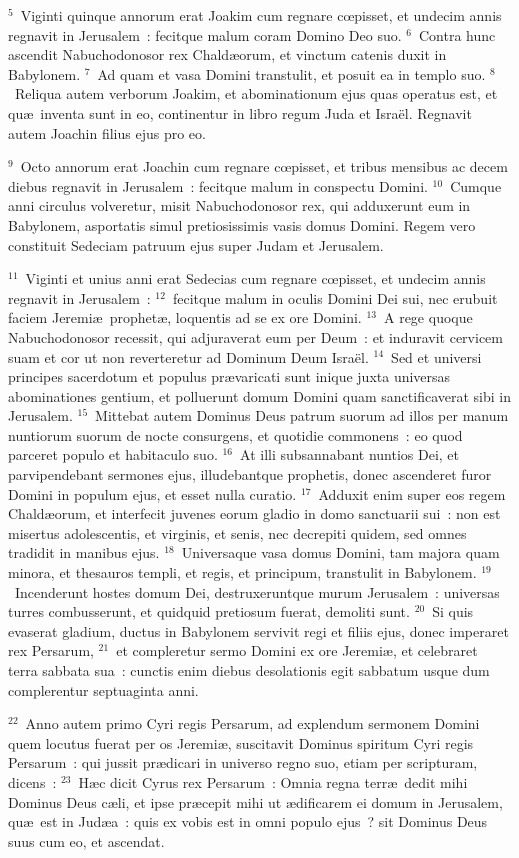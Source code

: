${}^{5}$~Viginti quinque annorum erat Joakim cum regnare cœpisset, et undecim annis regnavit in Jerusalem~: fecitque malum coram Domino Deo suo.
${}^{6}$~Contra hunc ascendit Nabuchodonosor rex Chald\ae orum, et vinctum catenis duxit in Babylonem.
${}^{7}$~Ad quam et vasa Domini transtulit, et posuit ea in templo suo.
${}^{8}$~Reliqua autem verborum Joakim, et abominationum ejus quas operatus est, et qu\ae\ inventa sunt in eo, continentur in libro regum Juda et Isra\"el. Regnavit autem Joachin filius ejus pro eo.


${}^{9}$~Octo annorum erat Joachin cum regnare cœpisset, et tribus mensibus ac decem diebus regnavit in Jerusalem~: fecitque malum in conspectu Domini.
${}^{10}$~Cumque anni circulus volveretur, misit Nabuchodonosor rex, qui adduxerunt eum in Babylonem, asportatis simul pretiosissimis vasis domus Domini. Regem vero constituit Sedeciam patruum ejus super Judam et Jerusalem.


${}^{11}$~Viginti et unius anni erat Sedecias cum regnare cœpisset, et undecim annis regnavit in Jerusalem~:
${}^{12}$~fecitque malum in oculis Domini Dei sui, nec erubuit faciem Jeremi\ae\ prophet\ae , loquentis ad se ex ore Domini.
${}^{13}$~A rege quoque Nabuchodonosor recessit, qui adjuraverat eum per Deum~: et induravit cervicem suam et cor ut non reverteretur ad Dominum Deum Isra\"el.
${}^{14}$~Sed et universi principes sacerdotum et populus pr\ae varicati sunt inique juxta universas abominationes gentium, et polluerunt domum Domini quam sanctificaverat sibi in Jerusalem.
${}^{15}$~Mittebat autem Dominus Deus patrum suorum ad illos per manum nuntiorum suorum de nocte consurgens, et quotidie commonens~: eo quod parceret populo et habitaculo suo.
${}^{16}$~At illi subsannabant nuntios Dei, et parvipendebant sermones ejus, illudebantque prophetis, donec ascenderet furor Domini in populum ejus, et esset nulla curatio.
${}^{17}$~Adduxit enim super eos regem Chald\ae orum, et interfecit juvenes eorum gladio in domo sanctuarii sui~: non est misertus adolescentis, et virginis, et senis, nec decrepiti quidem, sed omnes tradidit in manibus ejus.
${}^{18}$~Universaque vasa domus Domini, tam majora quam minora, et thesauros templi, et regis, et principum, transtulit in Babylonem.
${}^{19}$~Incenderunt hostes domum Dei, destruxeruntque murum Jerusalem~: universas turres combusserunt, et quidquid pretiosum fuerat, demoliti sunt.
${}^{20}$~Si quis evaserat gladium, ductus in Babylonem servivit regi et filiis ejus, donec imperaret rex Persarum,
${}^{21}$~et compleretur sermo Domini ex ore Jeremi\ae , et celebraret terra sabbata sua~: cunctis enim diebus desolationis egit sabbatum usque dum complerentur septuaginta anni.


${}^{22}$~Anno autem primo Cyri regis Persarum, ad explendum sermonem Domini quem locutus fuerat per os Jeremi\ae , suscitavit Dominus spiritum Cyri regis Persarum~: qui jussit pr\ae dicari in universo regno suo, etiam per scripturam, dicens~:
${}^{23}$~H\ae c dicit Cyrus rex Persarum~: Omnia regna terr\ae\ dedit mihi Dominus Deus c\ae li, et ipse pr\ae cepit mihi ut \ae dificarem ei domum in Jerusalem, qu\ae\ est in Jud\ae a~: quis ex vobis est in omni populo ejus~? sit Dominus Deus suus cum eo, et ascendat.
